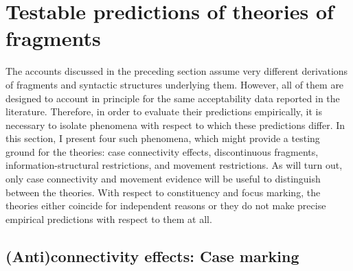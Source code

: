 \section{Testable predictions of theories of fragments}
\label{sec:theories-predictions}

The accounts discussed in the preceding section assume very different derivations of fragments and syntactic structures underlying them. However, all of them are designed to account in principle for the same acceptability data reported in the literature. Therefore, in order to evaluate their predictions empirically, it is necessary to isolate phenomena with respect to which these predictions differ. In this section, I present four such phenomena, which might provide a testing ground for the theories: case connectivity effects, discontinuous fragments, information-structural restrictions, and movement restrictions. As will turn out, only case connectivity and movement evidence will be useful to distinguish between the theories. With respect to constituency and focus marking, the theories either coincide for independent reasons or they do not make precise empirical predictions with respect to them at all.

\subsection{(Anti)connectivity effects: Case marking} \label{sec:theories-predictions-case}


